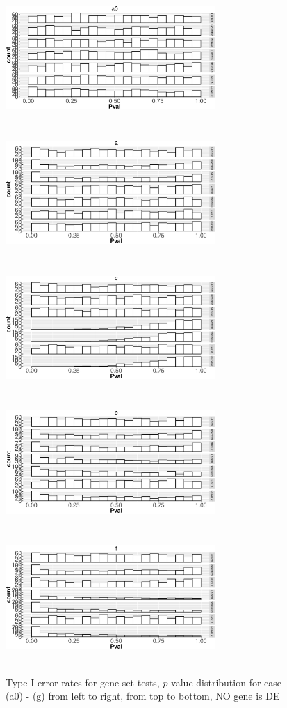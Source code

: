 \documentclass[11pt, a4paper]{article}
\begin{document}
		\begin{figure}[H]
			\caption{Type I error rates for gene set tests, $p$-value distribution for case (a0) - (g) from left to right, from top to bottom, NO gene is DE}\label{fig:typeIerror}
			 \begin{center}
				\includegraphics[width=8cm,height=5cm]{Figures/NODEA0.eps}
				\includegraphics[width=8cm,height=5cm]{Figures/NODEA.eps}
				\includegraphics[width=8cm,height=5cm]{Figures/NODEC.eps}
				\includegraphics[width=8cm,height=5cm]{Figures/NODEE.eps}
				\includegraphics[width=8cm,height=5cm]{Figures/NODEF.eps}

\end{center}
\end{figure}
\end{document}
